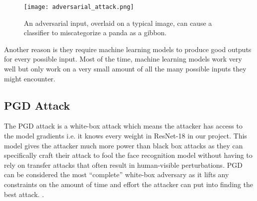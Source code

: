 \begin{figure}[h]
    \centering
    \texttt{[image: adversarial\_attack.png]}
    \caption{An adversarial input, overlaid on a typical image, can cause a classifier to miscategorize a panda as a gibbon.}
    \label{fig:adversarial_attack}
\end{figure}
    

Another reason is they require machine learning models to produce good outputs for every possible input. Most of the time, machine learning models work very well but only work on a very small amount of all the many possible inputs they might encounter. \cite{adversarial_2020}

\subsection{PGD Attack}

The PGD attack is a white-box attack which means the attacker has access to the model gradients i.e. it knows every weight in ResNet-18 in our project. This model gives the attacker much more power than black box attacks as they can specifically craft their attack to fool the face recognition model without having to rely on transfer attacks that often result in human-visible perturbations. PGD can be considered the most “complete” white-box adversary as it lifts any constraints on the amount of time and effort the attacker can put into finding the best attack. \cite{knagg_2019}.



